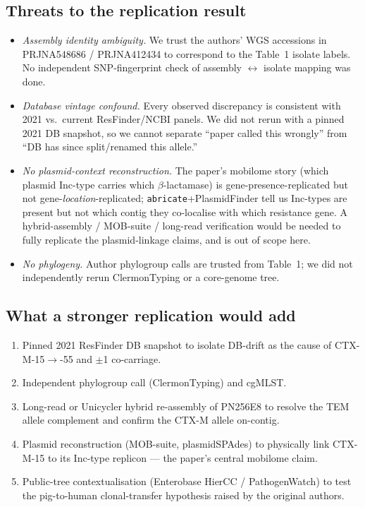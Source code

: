 \documentclass[11pt]{article}
\begin{document}
\subsection*{Threats to the replication result}
\begin{itemize}[leftmargin=1.4em]
  \item \emph{Assembly identity ambiguity.} We trust the authors' WGS
        accessions in PRJNA548686 / PRJNA412434 to correspond to the
        Table~1 isolate labels. No independent SNP-fingerprint check of
        assembly $\leftrightarrow$ isolate mapping was done.
  \item \emph{Database vintage confound.} Every observed discrepancy is
        consistent with 2021 vs.\ current ResFinder/NCBI panels. We did not
        rerun with a pinned 2021 DB snapshot, so we cannot separate
        ``paper called this wrongly'' from ``DB has since split/renamed
        this allele.''
  \item \emph{No plasmid-context reconstruction.} The paper's mobilome
        story (which plasmid Inc-type carries which $\beta$-lactamase) is
        gene-presence-replicated but not gene-\emph{location}-replicated;
        \texttt{abricate}+PlasmidFinder tell us Inc-types are present but
        not which contig they co-localise with which resistance gene.
        A hybrid-assembly / MOB-suite / long-read verification would be
        needed to fully replicate the plasmid-linkage claims, and is out of
        scope here.
  \item \emph{No phylogeny.} Author phylogroup calls are trusted from
        Table~1; we did not independently rerun ClermonTyping or a
        core-genome tree.
\end{itemize}

\subsection*{What a stronger replication would add}
\begin{enumerate}[leftmargin=1.4em]
  \item Pinned 2021 ResFinder DB snapshot to isolate DB-drift as the cause
        of CTX-M-15$\rightarrow$-55 and $\pm$1 co-carriage.
  \item Independent phylogroup call (ClermonTyping) and cgMLST.
  \item Long-read or Unicycler hybrid re-assembly of PN256E8 to resolve the
        TEM allele complement and confirm the CTX-M allele on-contig.
  \item Plasmid reconstruction (MOB-suite, plasmidSPAdes) to physically
        link CTX-M-15 to its Inc-type replicon --- the paper's central
        mobilome claim.
  \item Public-tree contextualisation (Enterobase HierCC / PathogenWatch)
        to test the pig-to-human clonal-transfer hypothesis raised by the
        original authors.
\end{enumerate}
\end{document}
